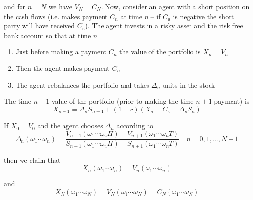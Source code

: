 \documentclass[12pt]{article}
\begin{document}
and for $n = N$ we have $V_N = C_N$. Now, consider an agent with a short position on the cash flows (i.e. makes payment $C_n$ at time $n$ -- if $C_n$ is negative the short party will have received $C_n$). The agent invests in a risky asset and the risk free bank account so that at time $n$
\begin{enumerate}
	\item Just before making a payment $C_n$ the value of the portfolio is $X_n = V_n$
	\item Then the agent makes payment $C_n$
	\item The agent rebalances the portfolio and takes $\Delta_n$ units in the stock
\end{enumerate}

The time $n + 1$ value of the portfolio (prior to making the time $n + 1$ payment) is
\begin{equation*}
	X_{n + 1} = \Delta_n S_{n + 1} + (1 + r)(X_n - C_n - \Delta_n S_n)
\end{equation*}

If $X_0 = V_0$ and the agent chooses $\Delta_n$ according to
\begin{equation*}
	\Delta_n(\omega_1\cdots\omega_n) = \frac{V_{n + 1}(\omega_1\cdots\omega_n H)  - V_{n + 1}(\omega_1\cdots\omega_n T)}{ S_{n + 1}(\omega_1\cdots\omega_n H) - S_{n + 1}(\omega_1\cdots\omega_n T) } \quad n = 0, 1, ..., N - 1
\end{equation*}

then we claim that
\begin{equation*}
	X_n(\omega_1\cdots\omega_n) = V_n(\omega_1\cdots\omega_n)
\end{equation*}

and
\begin{equation*}
	X_N(\omega_1\cdots\omega_N) = V_N(\omega_1\cdots\omega_N) = C_N(\omega_1\cdots\omega_N)
\end{equation*}
\end{document}
